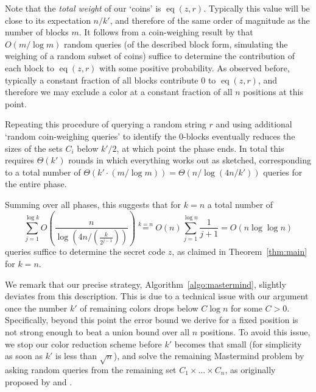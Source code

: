\documentclass[english,a4paper,11pt]{article}
\DeclareMathOperator{\eq}{eq}
\newcommand{\ifLongCites}[2]{#1}
\newcommand{\ifLongCites}[2]{#2}
\begin{document}
{Note that the \emph{total weight} of our `coins' is $\eq(z,r)$. Typically this value will be close to its expectation $n/k'$, and therefore of the same order of magnitude as  the number of blocks $m$. It follows from a coin-weighing result by \ifLongCites{\cite{grebinski-journal}}{Grebinski and  Kucherov~\cite{grebinski-journal}} that $O(m/\log m)$ random queries (of the described block form, simulating the weighing of a random subset of coins) suffice to determine the contribution of each block to $\eq(z,r)$ with some positive probability. As observed before, typically a constant fraction of all blocks contribute $0$ to $\eq(z,r)$, and therefore we may exclude a color at a constant fraction of all $n$ positions at this point.

Repeating this procedure of querying a random string $r$ and using additional `random coin-weighing queries' to identify the $0$-blocks eventually reduces the sizes of the sets $C_i$ below $k'/2$, at which point the phase ends. In total this requires $\Theta(k')$ rounds in which everything works out as sketched, corresponding to a total number of $\Theta(k'\cdot (m/\log m)) = \Theta(n / \log (4n/k'))$ queries for the entire phase.

Summing over all phases, this suggests that for $k=n$ a total number of
$$\sum_{j=1}^{\log k} O\left(\frac{n}{\log (4n/\left(\frac{k}{2^{j-1}} \right))}\right)  \stackrel{k = n}= O(n) \sum_{j=1}^{\log n} \frac{1}{j+1} = O(n \log \log n)
$$
queries suffice to determine the secret code $z$, as claimed in Theorem~\ref{thm:main} for $k=n$.

We remark that our precise strategy, Algorithm~\ref{algo:mastermind}, slightly deviates from this description. This is due to a technical issue with our argument once the number $k'$ of remaining colors drops below $C\log n$ for some $C>0$. Specifically, beyond this point the error bound we derive for a fixed position is not strong enough to beat a union bound over all $n$ positions. To avoid this issue, we stop our color reduction scheme before $k'$ becomes that small (for simplicity as soon as $k'$ is less than $\sqrt{n}$), and solve the remaining Mastermind problem by asking random queries from the remaining set $C_1\times \dots \times C_n$, as originally proposed by \ifLongCites{\cite{Erd63}}{Erd\H os and R\'enyi~\cite{Erd63}} and \ifLongCites{\cite{Chvatal83}}{Chv\'atal~\cite{Chvatal83}}. %

}
\end{document}
